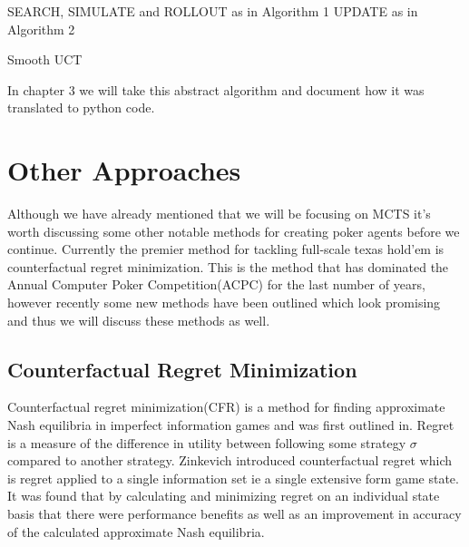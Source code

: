 \begin{algorithm}[H]
    \DontPrintSemicolon
    \LinesNumbered
    SEARCH, SIMULATE and ROLLOUT as in Algorithm 1\;
    UPDATE as in Algorithm 2\;
    \caption{Smooth UCT}
\end{algorithm}

In chapter 3 we will take this abstract algorithm and document how it was translated to
python code.


\section{Other Approaches}\label{sec:thImplementations}
Although we have already mentioned that we will be focusing on MCTS
it's worth discussing some other notable methods for creating poker 
agents before we continue.
Currently the premier method for tackling full-scale texas hold'em is counterfactual 
regret minimization.
This is the method that has dominated the Annual Computer Poker Competition(ACPC) for the 
last number of years, however recently some new methods have been outlined 
which look promising and thus we will discuss these methods as well.


\subsection{Counterfactual Regret Minimization}\label{subsec:thCFR}
Counterfactual regret minimization(CFR) is a method for finding approximate Nash
equilibria in imperfect information games and was first outlined in\citep{zinkevich2008regret}.
Regret is a measure of the difference in utility between following some strategy 
$\sigma$ compared to another strategy.
Zinkevich introduced counterfactual regret which is regret applied to a 
single information set ie a single extensive form game state.
It was found that by calculating and minimizing regret on an individual
state basis that there were performance benefits as well as an improvement 
in accuracy of the calculated approximate Nash equilibria.

